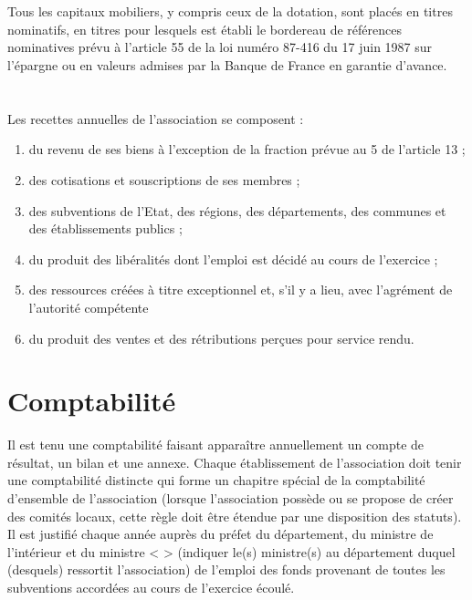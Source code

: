 \documentclass[a4paper,defaultorg]{organisation-contract}
\begin{document}
\section{}
Tous les capitaux mobiliers, y compris ceux de la dotation, sont placés en
titres nominatifs, en titres pour lesquels est établi le bordereau de références
nominatives prévu à l'article 55 de la loi numéro 87-416 du 17 juin 1987 sur
l'épargne ou en valeurs admises par la Banque de France en garantie d'avance.

\section{}
Les recettes annuelles de l'association se composent :
\begin{enumerate}
    \item du revenu de ses biens à l'exception de la fraction prévue au 5 de
        l'article 13 ;
    \item des cotisations et souscriptions de ses membres ;
    \item des subventions de l'Etat, des régions, des départements, des
        communes et des établissements publics ;
    \item du produit des libéralités dont l’emploi est décidé au cours de l’exercice ;
    \item des ressources créées à titre exceptionnel et, s'il y a lieu, avec
        l'agrément de l'autorité compétente
    \item du produit des ventes et des rétributions perçues pour service rendu.
\end{enumerate}

\section{Comptabilité}
Il est tenu une comptabilité faisant apparaître annuellement un compte de
résultat, un bilan et une annexe.  Chaque établissement de l'association doit
tenir une comptabilité distincte qui forme un chapitre spécial de la
comptabilité d'ensemble de l'association (lorsque l'association possède ou se
propose de créer des comités locaux, cette règle doit être étendue par une
disposition des statuts).  Il est justifié chaque année auprès du préfet du
département, du ministre de l'intérieur et du ministre < > (indiquer le(s)
ministre(s) au département duquel (desquels) ressortit l'association) de
l'emploi des fonds provenant de toutes les subventions accordées au cours de
l'exercice écoulé.
\end{document}
